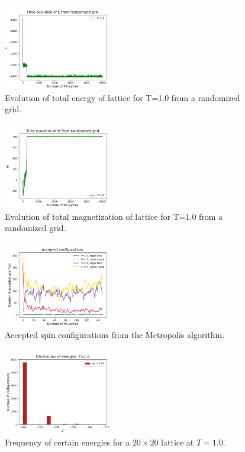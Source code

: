 \documentclass[notitlepage, reprint, nofootinbib]{revtex4-1}
\begin{document}
\begin{figure}%
	\centering 
	\includegraphics[width=0.45\textwidth]{../Figures/4c_E2.png}
	\caption{Evolution of total energy of lattice for T=1.0 from a randomized grid.}
	\label{fig5}
\end{figure}

\begin{figure}%
	\centering 
	\includegraphics[width=0.45\textwidth]{../Figures/4c_M2.png}
	\caption{Evolution of total magnetization of lattice for T=1.0 from a randomized grid.}
	\label{fig6}
\end{figure}

\begin{figure}%
	\centering 
	\includegraphics[width=0.45\textwidth]{../Figures/4c_accepted_config.png}
	\caption{Accepted spin configurations from the Metropolis algorithm.}
	\label{fig7}
\end{figure}

\begin{figure}%
	\centering 
	\includegraphics[width=0.45\textwidth]{../Figures/4d_histogram_T1.png}
	\caption{Frequency of certain energies for a $20\times20$ lattice at $T=1.0$.}
	\label{fig8}
\end{figure}
\end{document}
